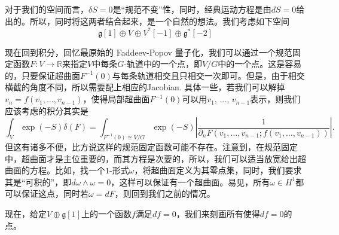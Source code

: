 \documentclass[10pt]{article}
\theoremstyle{definition}
\theoremstyle{plain}
\begin{document}
对于我们的空间而言，$\delta S=0$是“规范不变”性，同时，经典运动方程是由$dS=0$给出的。所以，同时将这两者结合起来，是一个自然的想法。我们考虑如下空间
\[
    \mathfrak g[1]\oplus V\oplus V^*[-1]\oplus \mathfrak g^*[-2]
\]

现在回到积分，回忆最原始的 Faddeev-Popov 量子化，我们可以通过一个规范固定函数$F:V\to \mathbb R$来指定$V$中每条$G$-轨道中的一个点，即$V/G$中的一个点。这是容易的，只要保证超曲面$F^{-1}(0)$与每条轨道相交且只相交一次即可。但是，由于相交横截的角度不同，所以需要配上相应的Jacobian. 具体一些，若我们可以解掉$v_n=f(v_1,\dots,v_{n-1})$，使得局部超曲面$F^{-1}(0)$可以用$v_1$, $\dots$, $v_{n-1}$表示，则我们应该考虑的积分其实是
\[
    \int_{V} \exp(-S)\delta(F)=\int_{F^{-1}(0)\cong V/G} \exp(-S)\left|\frac{1}{\partial_nF(v_1,\dots,v_{n-1};f(v_1,\dots,v_{n-1}))}\right|.
\]
但这有诸多不便，比方说这样的规范固定函数可能不存在。注意到，在规范固定中，超曲面才是主位重要的，而其方程是次要的，所以，我们可以适当放宽给出超曲面的方程。比如，找一个$1$-形式$\omega$，将超曲面定义为其零点集，同时，我们要求其是“可积的”，即$d\omega\wedge \omega=0$，这样可以保证有一个超曲面。易见，所有$\omega\in H^1$都可以保证这点，同时若$\omega=dF$，则回到我们之前的情况。

现在，给定$V\oplus \mathfrak g[1]$上的一个函数$f$满足$df=0$，我们来刻画所有使得$df=0$的点。
\end{document}
